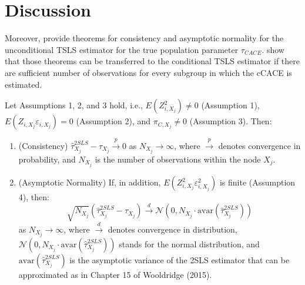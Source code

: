 \chapter{Discussion}

Moreover, \cite{Wooldridge2015} provide theorems for consistency and asymptotic normality for the unconditional TSLS estimator for the true population parameter $\tau_{CACE}$. \cite{bargagli-stoffi_heterogeneous_2022} show that those theorems can be transferred to the conditional TSLS estimator if there are sufficient number of observations for every subgroup in which the cCACE is estimated. 

\begin{thm}
   Let Assumptions 1, 2, and 3 hold, i.e., \(E(Z^2_{i,X_j}) \neq 0\) (Assumption 1), \(E(Z_{i,X_j} \varepsilon_{i,X_j}) = 0\) (Assumption 2), and \(\pi_{C,X_j} \neq 0\) (Assumption 3). Then:
   \begin{enumerate}
       \item (Consistency) \( \hat{\tau}^{2SLS}_{X_j} - \tau_{X_j} \overset{p}{\to} 0 \) as \( N_{X_j} \to \infty \), where \( \overset{p}{\to} \) denotes convergence in probability, and \( N_{X_j} \) is the number of observations within the node \( X_j \).
       \item (Asymptotic Normality) If, in addition, \(E(Z^2_{i,X_j} \varepsilon^2_{i,X_j})\) is finite (Assumption 4), then:
       \[
       \sqrt{N_{X_j}} (\hat{\tau}^{2SLS}_{X_j} - \tau_{X_j}) \overset{d}{\to} \mathcal{N}(0, N_{X_j} \cdot \text{avar}(\hat{\tau}^{2SLS}_{X_j}))
       \]
       as \(N_{X_j} \to \infty\), where \( \overset{d}{\to} \) denotes convergence in distribution, \( \mathcal{N}(0, N_{X_j} \cdot \text{avar}(\hat{\tau}^{2SLS}_{X_j})) \) stands for the normal distribution, and \(\text{avar}(\hat{\tau}^{2SLS}_{X_j})\) is the asymptotic variance of the 2SLS estimator that can be approximated as in Chapter 15 of Wooldridge (2015).
   \end{enumerate}
\end{thm}